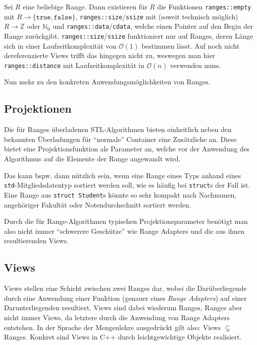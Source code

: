 \documentclass[runningheads]{llncs}
\begin{document}

Sei $R$ eine beliebige Range.
Dann existieren für $R$ die Funktionen \texttt{ranges::empty} mit $R\to\{\texttt{true},\texttt{false}\}$, \texttt{ranges::size}/\texttt{ssize} mit (soweit technisch möglich) $R\to\mathbb{Z}$ oder $\mathbb{N}_0$ und \texttt{ranges::data}/\texttt{cdata}, welche einen Pointer auf den Begin der Range zurückgibt.
\texttt{ranges::size}/\texttt{ssize} funktioniert nur auf Ranges, deren Länge sich in einer Laufzeitkomplexität von $\mathcal{O}(1)$ bestimmen lässt.
Auf noch nicht dereferenzierte Views trifft das hingegen nicht zu, weswegen man hier \texttt{ranges::distance} mit Laufzeitkomplexität in $\mathcal{O}(n)$ verwenden muss.

Nun mehr zu den konkreten Anwendungsmöglichkeiten von Ranges.

\subsection{Projektionen}

Die für Ranges überladenen STL-Algorithmen bieten einheitlich neben den bekannten Überladungen für \enquote{normale} Container eine Zusätzliche an.
Diese bietet eine Projektionsfunktion als Parameter an, welche vor der Anwendung des Algorithmus auf die Elemente der Range angewandt wird.

Das kann bspw. dann nützlich sein, wenn eine Range eines Typs anhand eines \texttt{std}-Mitgliedsdatentyp sortiert werden soll, wie es häufig bei \texttt{struct}s der Fall ist.
Eine Range aus \texttt{struct Student}s könnte so sehr kompakt nach Nachnamen, angehöriger Fakultät oder Notendurchschnitt sortiert werden.

Durch die für Range-Algorithmen typischen Projektionsparameter benötigt man also nicht immer \enquote{schwerere Geschütze} wie Range Adapters und die aus ihnen resultierenden Views.

\subsection{Views}

Views stellen eine Schicht zwischen zwei Ranges dar, wobei die Darüberliegende durch eine Anwendung einer Funktion (genauer eines \textit{Range Adapters}) auf einer Darunterliegenden resultiert.
Views sind dabei wiederum Ranges, Ranges aber nicht immer Views, da letztere durch die Anwendung von Range Adapters entstehen.
In der Sprache der Mengenlehre ausgedrückt gilt also: Views $\subsetneq$ Ranges.
Konkret sind Views in C++ durch leichtgewichtige Objekte realisiert.
\end{document}
